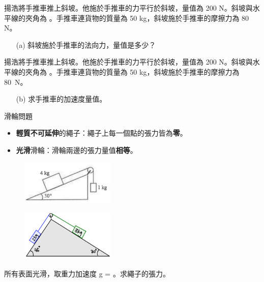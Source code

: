 \documentclass[beamer=true]{standalone}
\begin{document}
\begin{eg}
    揚浩將手推車推上斜坡。他施於手推車的力平行於斜坡，量值為 200 N。斜坡與水平線的夾角為 。手推車連貨物的質量為 50 kg，斜坡施於手推車的摩擦力為 80 N。

    \begin{itemize}
        \item[(a)] 斜坡施於手推車的法向力，量值是多少？
    \end{itemize}

\end{eg}
\begin{eg}
    揚浩將手推車推上斜坡。他施於手推車的力平行於斜坡，量值為 200 N。斜坡與水平線的夾角為 。手推車連貨物的質量為 50 kg，斜坡施於手推車的摩擦力為 \qty{80}{N}。
    \begin{itemize}
        \item[(b)] 求手推車的加速度量值。
    \end{itemize}
\end{eg}

\begin{frame}{滑輪問題}
    \begin{itemize}
        \item \textbf{輕質不可延伸}的繩子：繩子上每一個點的張力皆為\textbf{零}。
        \item \textbf{光滑}滑輪：滑輪兩邊的張力量值\textbf{相等}。
    \end{itemize}
    \begin{figure}[h!]
        \centering
        \includegraphics[width=0.4\textwidth]{assets/54dc796f.png}
    \end{figure}
\end{frame}


\begin{eg}
    \begin{figure}[h!]
        \centering
        \includegraphics[width=0.4\textwidth]{assets/a078f185.png}
    \end{figure}
    所有表面光滑，取重力加速度 g = 。求繩子的張力。
\end{eg}
\end{document}
